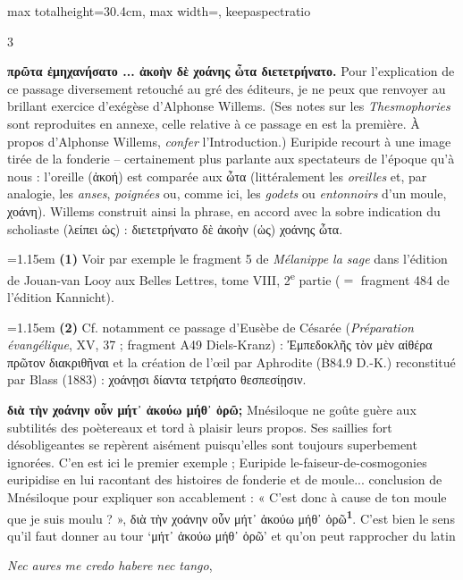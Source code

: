 \documentclass[11pt,twoside]{book}
\newcommand{\italique}[1]{\textit{#1}}
\newcommand{\citComm}[1]{\begin{quoting}[vskip=0.4pt,leftmargin=0.7em,rightmargin=0.2em]#1\end{quoting}}
\newcommand{\nieme}[1]{#1\textsuperscript{e}}
\newcommand{\latin}[1]{\textit{#1}}
\newcommand{\marqueur}[1]{\textsuperscript{\color{rubricRed}\textbf{#1}}}
\begin{document}
\begin{adjustbox}{max totalheight=30.4cm, max width=\textwidth, keepaspectratio}
\begin{minipage}{\textwidth}
{\begin{multicols}{3}
\par\vspace{1.5pt}
 \textbf{πρῶτα ἐμηχανήσατο ... ἀκοὴν δὲ χοάνης ὦτα διετετρήνατο.} Pour l'explication de ce passage diversement retouché au gré des éditeurs, je ne peux que renvoyer au brillant exercice d'exégèse d'Alphonse Willems. (Ses notes sur les \italique{Thesmophories} sont reproduites en annexe, celle relative à ce passage en est la première. À propos d'Alphonse Willems, \italique{confer} l'Introduction.) Euripide recourt à une image tirée de la fonderie -- certainement plus parlante aux spectateurs de l'époque qu'à nous : l'oreille (ἀκοή) est comparée aux ὦτα (littéralement les \italique{oreilles} et, par analogie, les \italique{anses}, \italique{poignées} ou, comme ici, les \italique{godets} ou \italique{entonnoirs} d'un moule, χοάνη). Willems construit ainsi la phrase, en accord avec la sobre indication du scholiaste (λείπει ὡς) : διετετρήνατο δὲ ἀκοὴν (ὡς) χοάνης ὦτα.
\par\vspace{1.5pt}
\par\vspace{1.2pt}\par\nopagebreak\vspace{1pt}\noindent\hangindent=1.15em {\color{sepiaNote}\textbf{(1)}} Voir par exemple le fragment 5 de \italique{Mélanippe la sage} dans l'édition de Jouan-van Looy aux Belles Lettres, tome VIII, \nieme{2} partie ($=$ fragment 484 de l'édition Kannicht).
\par\vspace{1.5pt}
\noindent\hangindent=1.15em {\color{sepiaNote}\textbf{(2)}} Cf. notamment ce passage d'Eusèbe de Césarée (\italique{Préparation évangélique}, XV, 37 ; fragment A49 Diels-Kranz) : Ἐμπεδοκλῆς τὸν μὲν αἰθέρα πρῶτον διακριθῆναι et la création de l'œil par Aphrodite (B84.9 D.-K.) reconstitué par Blass (1883) : χοάνῃσι δίαντα τετρήατο θεσπεσίῃσιν.
\par\vspace{1.5pt}
 \textbf{διὰ τὴν χοάνην οὖν μήτ᾽ ἀκούω μήθ᾽ ὁρῶ;} Mnésiloque ne goûte guère aux subtilités des poètereaux et tord à plaisir leurs propos. Ses saillies fort désobligeantes se repèrent aisément puisqu'elles sont toujours superbement ignorées. C'en est ici le premier exemple ; Euripide le-faiseur-de-cosmogonies euripidise en lui racontant des histoires de fonderie et de moule... conclusion de Mnésiloque pour expliquer son accablement : « C'est donc à cause de ton moule que je suis moulu ? », διὰ τὴν χοάνην οὖν μήτ᾽ ἀκούω μήθ᾽ ὁρῶ\marqueur{1}. C'est bien le sens qu'il faut donner au tour `μήτ᾽ ἀκούω μήθ᾽ ὁρῶ' et qu'on peut rapprocher du latin \citComm{\latin{Nec aures me credo habere nec tango},\\
}
\end{multicols}}
\end{minipage}
\end{adjustbox}
\end{document}
